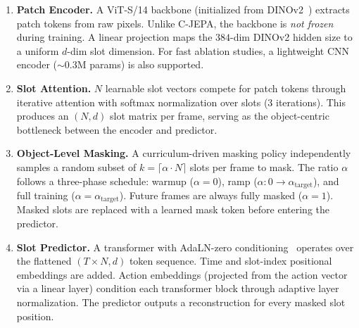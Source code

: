 \documentclass[12pt]{article}
\begin{document}
\begin{enumerate}[label=\textbf{M\arabic*:}, leftmargin=*]
    \item \textbf{Patch Encoder.} A ViT-S/14 backbone (initialized from DINOv2~\citep{oquab2023dinov2}) extracts patch tokens from raw pixels. Unlike C-JEPA, the backbone is \emph{not frozen} during training. A linear projection maps the $384$-dim DINOv2 hidden size to a uniform $d$-dim slot dimension. For fast ablation studies, a lightweight CNN encoder ($\sim$0.3M params) is also supported.

    \item \textbf{Slot Attention.} $N$ learnable slot vectors compete for patch tokens through iterative attention with softmax normalization over slots (3 iterations). This produces an $(N, d)$ slot matrix per frame, serving as the object-centric bottleneck between the encoder and predictor.

    \item \textbf{Object-Level Masking.} A curriculum-driven masking policy independently samples a random subset of $k = \lceil \alpha \cdot N \rceil$ slots per frame to mask. The ratio $\alpha$ follows a three-phase schedule: warmup ($\alpha = 0$), ramp ($\alpha: 0 \rightarrow \alpha_{\text{target}}$), and full training ($\alpha = \alpha_{\text{target}}$). Future frames are always fully masked ($\alpha = 1$). Masked slots are replaced with a learned mask token before entering the predictor.

    \item \textbf{Slot Predictor.} A transformer with AdaLN-zero conditioning~\citep{peebles2023dit} operates over the flattened $(T \times N, d)$ token sequence. Time and slot-index positional embeddings are added. Action embeddings (projected from the action vector via a linear layer) condition each transformer block through adaptive layer normalization. The predictor outputs a reconstruction for every masked slot position.
\end{enumerate}
\end{document}
